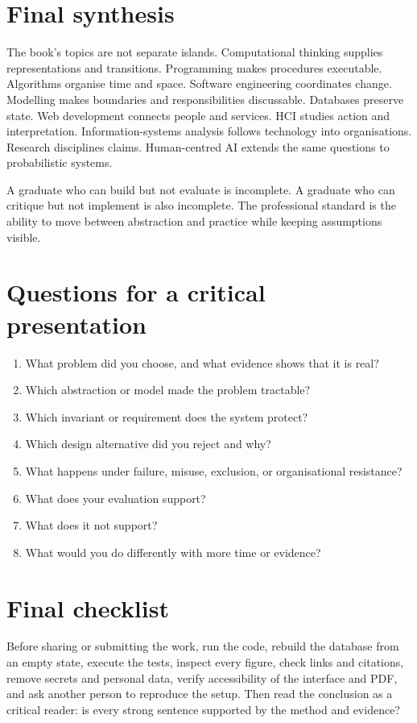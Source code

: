 \section{Final synthesis}
The book's topics are not separate islands. Computational thinking supplies representations and transitions. Programming makes procedures executable. Algorithms organise time and space. Software engineering coordinates change. Modelling makes boundaries and responsibilities discussable. Databases preserve state. Web development connects people and services. HCI studies action and interpretation. Information-systems analysis follows technology into organisations. Research disciplines claims. Human-centred AI extends the same questions to probabilistic systems.

A graduate who can build but not evaluate is incomplete. A graduate who can critique but not implement is also incomplete. The professional standard is the ability to move between abstraction and practice while keeping assumptions visible.

\section{Questions for a critical presentation}
\begin{enumerate}
\item What problem did you choose, and what evidence shows that it is real?
\item Which abstraction or model made the problem tractable?
\item Which invariant or requirement does the system protect?
\item Which design alternative did you reject and why?
\item What happens under failure, misuse, exclusion, or organisational resistance?
\item What does your evaluation support?
\item What does it not support?
\item What would you do differently with more time or evidence?
\end{enumerate}

\section{Final checklist}
Before sharing or submitting the work, run the code, rebuild the database from an empty state, execute the tests, inspect every figure, check links and citations, remove secrets and personal data, verify accessibility of the interface and PDF, and ask another person to reproduce the setup. Then read the conclusion as a critical reader: is every strong sentence supported by the method and evidence?

